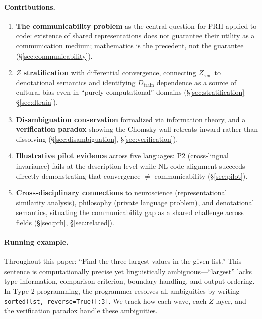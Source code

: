 \documentclass[11pt]{article}
\theoremstyle{definition}
\newcommand{\Zsem}{Z_{\text{sem}}}
\newcommand{\Dtrain}{D_{\text{train}}}
\begin{document}
\paragraph{Contributions.}
\begin{enumerate}[label=(\arabic*),nosep]
  \item \textbf{The communicability problem} as the central question for PRH applied to code: existence of shared representations does not guarantee their utility as a communication medium; mathematics is the precedent, not the guarantee (\S\ref{sec:communicability}).
  \item \textbf{$Z$ stratification} with differential convergence, connecting $\Zsem$ to denotational semantics and identifying $\Dtrain$ dependence as a source of cultural bias even in ``purely computational'' domains (\S\ref{sec:stratification}--\S\ref{sec:dtrain}).
  \item \textbf{Disambiguation conservation} formalized via information theory, and a \textbf{verification paradox} showing the Chomsky wall retreats inward rather than dissolving (\S\ref{sec:disambiguation}, \S\ref{sec:verification}).
  \item \textbf{Illustrative pilot evidence} across five languages: P2 (cross-lingual invariance) fails at the description level while NL-code alignment succeeds---directly demonstrating that convergence $\neq$ communicability (\S\ref{sec:pilot}).
  \item \textbf{Cross-disciplinary connections} to neuroscience (representational similarity analysis), philosophy (private language problem), and denotational semantics, situating the communicability gap as a shared challenge across fields (\S\ref{sec:prh}, \S\ref{sec:related}).
\end{enumerate}

\paragraph{Running example.}
Throughout this paper: ``Find the three largest values in the given list.'' This sentence is computationally precise yet linguistically ambiguous---``largest'' lacks type information, comparison criterion, boundary handling, and output ordering. In Type-2 programming, the programmer resolves all ambiguities by writing \texttt{sorted(lst, reverse=True)[:3]}. We track how each wave, each $Z$ layer, and the verification paradox handle these ambiguities.
\end{document}
